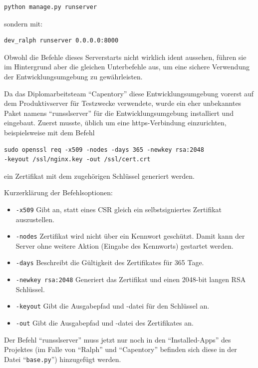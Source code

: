 \begin{verbatim}
python manage.py runserver
\end{verbatim}

sondern mit:

\begin{verbatim}
dev_ralph runserver 0.0.0.0:8000
\end{verbatim}

Obwohl die Befehle dieses Serverstarts nicht wirklich ident aussehen,
führen sie im Hintergrund aber die gleichen Unterbefehle aus, um eine
sichere Verwendung der Entwicklungsumgebung zu gewährleisten.

Da das Diplomarbeitsteam ``Capentory'' diese Entwicklungsumgebung
vorerst auf dem Produktivserver für Testzwecke verwendete, wurde ein
eher unbekanntes Paket namens ``runsslserver'' für die
Entwicklungsumgebung installiert und eingebaut. Zuerst musste, üblich um
eine https-Verbindung einzurichten, beispielsweise mit dem Befehl

\begin{verbatim}
sudo openssl req -x509 -nodes -days 365 -newkey rsa:2048 
-keyout /ssl/nginx.key -out /ssl/cert.crt
\end{verbatim}

ein Zertifikat mit dem zugehörigen Schlüssel generiert werden.

Kurzerklärung der Befehlsoptionen:

\begin{itemize}
\tightlist
\item
  \texttt{-x509} Gibt an, statt eines CSR gleich ein selbstsigniertes
  Zertifikat auszustellen.
\item
  \texttt{-nodes} Zertifikat wird nicht über ein Kennwort geschützt.
  Damit kann der Server ohne weitere Aktion (Eingabe des Kennworts)
  gestartet werden.
\item
  \texttt{-days} Beschreibt die Gültigkeit des Zertifikates für 365
  Tage.
\item
  \texttt{-newkey\ rsa:2048} Generiert das Zertifikat und einen 2048-bit
  langen RSA Schlüssel.
\item
  \texttt{-keyout} Gibt die Ausgabepfad und -datei für den Schlüssel an.
\item
  \texttt{-out} Gibt die Ausgabepfad und -datei des Zertifikates an.
\end{itemize}

Der Befehl ``runsslserver'' muss jetzt nur noch in den
``Installed-Apps'' des Projektes (im Falle von ``Ralph'' und
``Capentory'' befinden sich diese in der Datei ``\texttt{base.py}'')
hinzugefügt werden.

